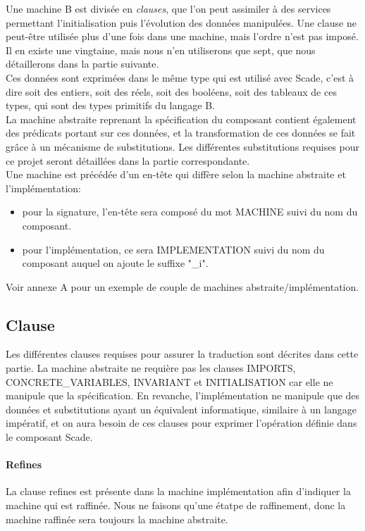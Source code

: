 Une machine B est divisée en \emph{clauses}, que l'on peut assimiler à
des services permettant l'initialisation puis l'évolution des données
manipulées. Une clause ne peut-être utilisée plus d'une fois dans une
machine, mais l'ordre n'est pas imposé. Il en existe une vingtaine,
mais nous n'en utiliserons que sept, que nous détaillerons dans la
partie suivante.\\ 
Ces données sont exprimées dans le même type qui est utilisé avec
Scade, c'est à dire soit des entiers, soit des réels, soit des
booléens, soit des tableaux de ces types, qui sont des types primitifs
du langage B. \\ 
La machine abstraite reprenant la spécification du composant contient
également des prédicats portant sur ces données, et la transformation
de ces données se fait grâce à un mécanisme de substitutions. Les
différentes substitutions requises pour ce projet seront détaillées
dans la partie correspondante. \\
Une machine est précédée d'un en-tête qui diffère selon la machine
abstraite et l'implémentation:
\begin{itemize}
\item pour la signature, l'en-tête sera composé du mot MACHINE suivi
  du nom du composant.
\item pour l'implémentation, ce sera IMPLEMENTATION suivi du nom du
  composant auquel on ajoute le suffixe "\_i".
\end{itemize}
Voir annexe A pour un exemple de couple de machines abstraite/implémentation.



\subsection{Clause}
Les différentes clauses requises pour assurer la traduction sont
décrites dans cette partie. La machine abstraite ne requière pas les
clauses IMPORTS, CONCRETE\_VARIABLES, INVARIANT et INITIALISATION car
elle ne manipule que la spécification. En revanche, l'implémentation ne
manipule que des données et substitutions ayant un équivalent
informatique, similaire à un langage impératif, et on aura besoin de
ces clauses pour exprimer l'opération définie dans le composant Scade.

\paragraph{Refines}
La clause refines est présente dans la machine implémentation afin
d'indiquer la machine qui est raffinée. Nous ne faisons qu'une étatpe
de raffinement, donc la machine raffinée sera toujours la machine
abstraite. 

